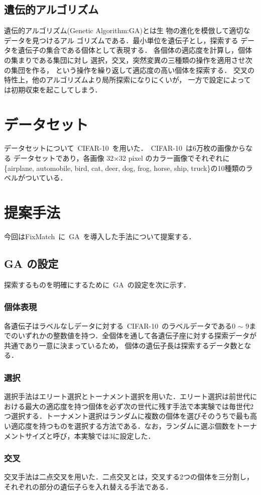 \documentclass[twocolumn]{jarticle}     %
\begin{document}
\subsection{遺伝的アルゴリズム}
遺伝的アルゴリズム(Genetic Algorithm:GA)\cite{whitley1994genetic}とは生
物の進化を模倣して適切なデータを見つけるアル
ゴリズムである．最小単位を遺伝子とし，探索する
データを遺伝子の集合である個体として表現する．
各個体の適応度を計算し，個体の集まりである集団に対し
選択，交叉，突然変異の三種類の操作を適用させ次の集団を作る，
という操作を繰り返して適応度の高い個体を探索する．
交叉の特性上，他のアルゴリズムより局所探索になりにくいが，
一方で設定によっては初期収束を起こしてしまう．
\section{データセット}
データセットについて\ CIFAR-10\ を用いた．\ CIFAR-10\ は6万枚の画像からなる
データセットであり，各画像 32×32 pixel のカラー画像でそれぞれに\{airplane, automobile, bird, cat, deer, dog, frog, horse, ship, truck\}の10種類のラベルがついている．
\section{提案手法}
今回はFixMatch\ に\ GA\ を導入した手法について提案する．
\subsection{GA の設定}
探索するものを明確にするために\ GA\ の設定を次に示す．
\subsubsection{個体表現}
各遺伝子はラベルなしデータに対する\ CIFAR-10\ のラベルデータである0 $\sim$ 9までのいずれかの整数値を持つ．全個体を通して各遺伝子座に対する探索データが共通であり一意に決まっているため，
個体の遺伝子長は探索するデータ数となる．

\subsubsection{選択}
選択手法はエリート選択とトーナメント選択を用いた．エリート選択は前世代における最大の適応度を持つ個体を必ず次の世代に残す手法で本実験では毎世代2つ選択する．トーナメント選択はランダムに複数の個体を選びそのうちで最も高い適応度を持つものを選択する方法である．なお，ランダムに選ぶ個数をトーナメントサイズと呼び，本実験では3に設定した．

\subsubsection{交叉}
交叉手法は二点交叉を用いた．二点交叉とは，交叉する2つの個体を三分割し，それぞれの部分の遺伝子らを入れ替える手法である．
\end{document}

